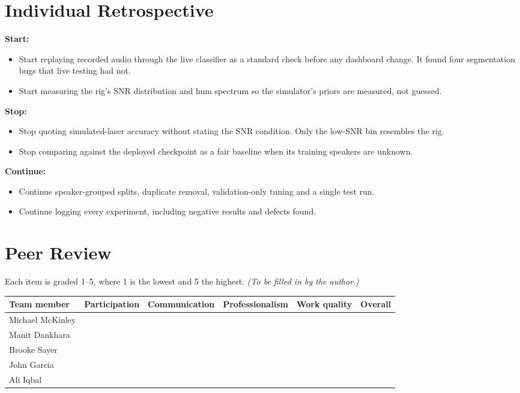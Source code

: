 \documentclass{article}
\begin{document}
\section{Individual Retrospective}
\textbf{Start:}
\begin{itemize}[leftmargin=0.25in]
\item Start replaying recorded audio through the live classifier as a standard check before any dashboard change. It found four segmentation bugs that live testing had not.
\item Start measuring the rig's SNR distribution and hum spectrum so the simulator's priors are measured, not guessed.
\end{itemize}
\textbf{Stop:}
\begin{itemize}[leftmargin=0.25in]
\item Stop quoting simulated-laser accuracy without stating the SNR condition. Only the low-SNR bin resembles the rig.
\item Stop comparing against the deployed checkpoint as a fair baseline when its training speakers are unknown.
\end{itemize}
\textbf{Continue:}
\begin{itemize}[leftmargin=0.25in]
\item Continue speaker-grouped splits, duplicate removal, validation-only tuning and a single test run.
\item Continue logging every experiment, including negative results and defects found.
\end{itemize}

\section{Peer Review}\label{sec:peer}
Each item is graded 1--5, where 1 is the lowest and 5 the highest. \textit{(To be filled in by the author.)}

\begin{center}
\scriptsize
\begin{tabular}{|p{1.35in}|>{\centering\arraybackslash}p{0.82in}|>{\centering\arraybackslash}p{0.9in}|>{\centering\arraybackslash}p{1.0in}|>{\centering\arraybackslash}p{0.78in}|>{\centering\arraybackslash}p{0.62in}|}
\hline
\rowcolor{headerblue}\textbf{Team member} & \textbf{Participation} & \textbf{Communication} & \textbf{Professionalism} & \textbf{Work quality} & \textbf{Overall} \\ \hline
Michael McKinley & & & & & \\ \hline
Manit Dankhara & & & & & \\ \hline
Brooke Sayer & & & & & \\ \hline
John Garcia & & & & & \\ \hline
Ali Iqbal & & & & & \\ \hline
\end{tabular}
\end{center}
\end{document}
